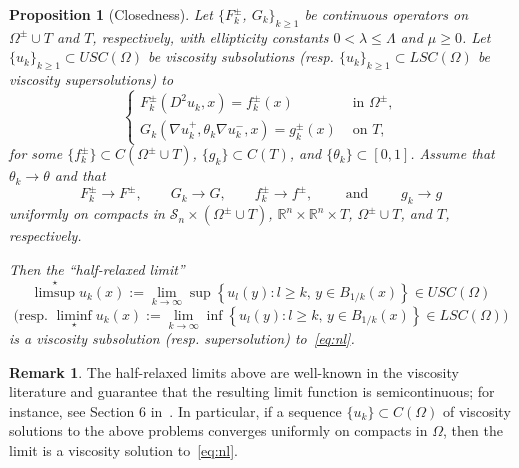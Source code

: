 \documentclass[letter,11pt]{amsart}
\newcommand{\R}{\mathbb{R}}
\newcommand{\scal}{\mathcal{S}}
\newcommand{\uppers}{USC}
\newcommand{\lowers}{LSC}
\newtheorem{prop}[thm]{Proposition}
\theoremstyle{definition}
\newtheorem{rem}[thm]{Remark}
\numberwithin{equation}{section}
\begin{document}
\begin{prop}[Closedness]
\label{prop:closed}
Let $\{F_k^{\pm}$, $G_k\}_{k\geq 1}$ be continuous operators on $\Omega^{\pm}\cup T$ and $T$, respectively, with ellipticity constants $0 < \lambda \leq \Lambda$ and $\mu \geq 0$.
Let $\{u_k\}_{k\geq1} \subset \uppers(\Omega)$ be viscosity subsolutions (resp. $\{u_k\}_{k\geq1} \subset \lowers(\Omega)$ be viscosity supersolutions) to 
\[
\begin{cases}
F_k^{\pm}(D^2 u_k, x) = f_k^{\pm}(x) & \text{ in } \Omega^{\pm},\\
G_k(\nabla u^{+}_k, \theta_k \nabla u^{-}_k, x) =  g_k^{\pm}(x) & \text{ on } T,
\end{cases}
\]
for some $\{f_k^{\pm}\} \subset C(\Omega^{\pm} \cup T)$, $\{g_k\} \subset C(T)$, and $\{\theta_k\} \subset [0,1]$.
Assume that $\theta_k \to \theta$ and that
\[
F_{k}^{\pm} \to F^{\pm}, \qquad G_k \to G, \qquad f_{k}^{\pm} \to f^{\pm}, \qquad \text{ and } \qquad g_k \to g
\]
uniformly on compacts in $\scal_n \times (\Omega^{\pm} \cup T)$, $\R^{n}\times \R^{n} \times T$, $\Omega^{\pm} \cup T$, and $T$, respectively.

Then the ``half-relaxed limit''
\[
\textstyle
\limsup^{\star} u_k(x) :=
\displaystyle
\lim_{k \to \infty} \sup \left\{ 
u_l(y) \colon l \geq k, \, y \in B_{1/k}(x)
\right\} 
\in \uppers(\Omega)
\]
\[
\text{(resp. }
\textstyle
\liminf_{\star} u_k(x)
\displaystyle
:= \lim_{k \to \infty} \inf \left\{ 
u_l(y) \colon l \geq k, \, y \in B_{1/k}(x)
\right\} 
\in \lowers(\Omega)
\text{)}
\]
is a viscosity subsolution (resp. supersolution) to~\eqref{eq:nl}.
\end{prop}

\begin{rem}
The half-relaxed limits above are well-known in the viscosity literature and guarantee that the resulting limit function is semicontinuous; for instance, see Section 6 in~\cite{CIL}.
In particular, if a sequence $\{u_k\} \subset C(\Omega)$ of viscosity solutions to the above problems converges uniformly on compacts in $\Omega$, then the limit is a viscosity solution to~\eqref{eq:nl}.
\end{rem}
\end{document}
